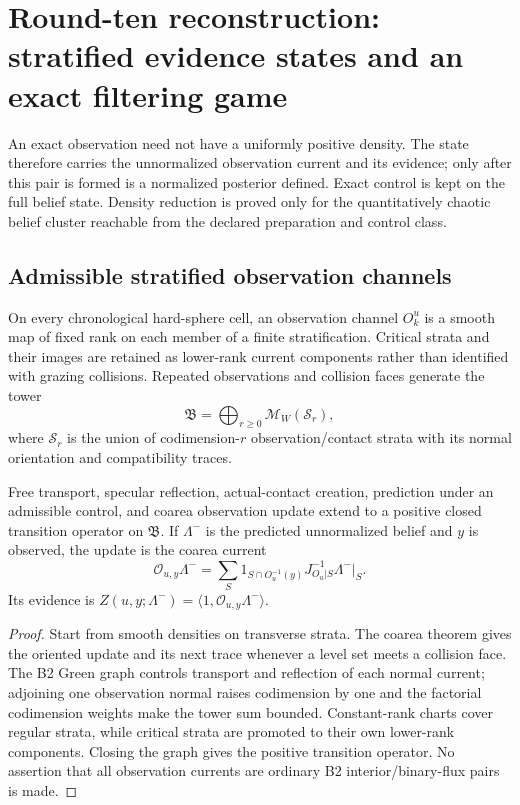 \section{Round-ten reconstruction: stratified evidence states and an exact filtering game}
\label{sec:r10-c1}

An exact observation need not have a uniformly positive density.  The state
therefore carries the unnormalized observation current and its evidence; only
after this pair is formed is a normalized posterior defined.  Exact control is
kept on the full belief state.  Density reduction is proved only for the
quantitatively chaotic belief cluster reachable from the declared preparation
and control class.

\subsection{Admissible stratified observation channels}

On every chronological hard-sphere cell, an observation channel
\(O_k^u\) is a smooth map of fixed rank on each member of a finite
stratification.  Critical strata and their images are retained as lower-rank
current components rather than identified with grazing collisions.  Repeated
observations and collision faces generate the tower
\[
 \mathfrak B=\bigoplus_{r\ge0}\mathcal M_W(\mathcal S_r),
\]
where \(\mathcal S_r\) is the union of codimension-\(r\) observation/contact
strata with its normal orientation and compatibility traces.

\begin{theorem}
\label{thm:r10-c1-tower}
Free transport, specular reflection, actual-contact creation, prediction under
an admissible control, and coarea observation update extend to a positive
closed transition operator on \(\mathfrak B\).  If \(\Lambda^-\) is the
predicted unnormalized belief and \(y\) is observed, the update is the coarea
current
\[
 \mathcal O_{u,y}\Lambda^-
 =\sum_{S}
 1_{S\cap O_u^{-1}(y)}J_{O_u|S}^{-1}\Lambda^-|_S.
\]
Its evidence is
\(Z(u,y;\Lambda^-)=\langle1,\mathcal O_{u,y}\Lambda^-\rangle\).
\end{theorem}

\begin{proof}
Start from smooth densities on transverse strata.  The coarea theorem gives
the oriented update and its next trace whenever a level set meets a collision
face.  The B2 Green graph controls transport and reflection of each normal
current; adjoining one observation normal raises codimension by one and the
factorial codimension weights make the tower sum bounded.  Constant-rank
charts cover regular strata, while critical strata are promoted to their own
lower-rank components.  Closing the graph gives the positive transition
operator.  No assertion that all observation currents are ordinary B2
interior/binary-flux pairs is made.
\end{proof}


